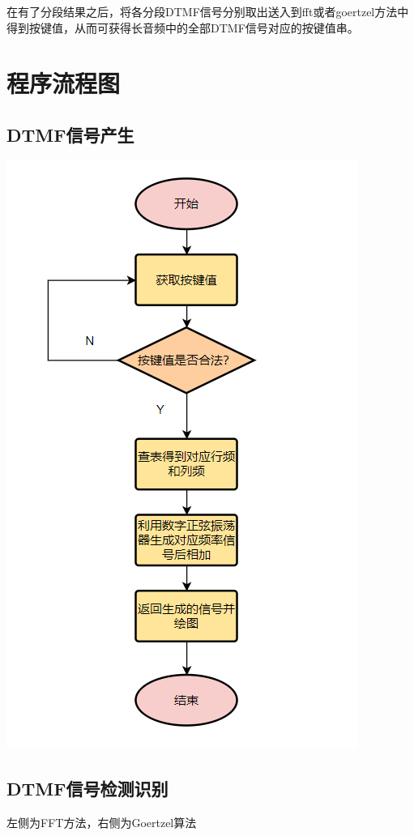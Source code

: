 \documentclass[10pt, a4paper]{article}
\begin{document}
    在有了分段结果之后，将各分段DTMF信号分别取出送入到fft或者goertzel方法中得到按键值，从而可获得长音频中的全部DTMF信号对应的按键值串。

\section{程序流程图}

\subsection{DTMF信号产生}
\centerline{\includegraphics[scale=0.8]{assets/3.png}}

\subsection{DTMF信号检测识别}
左侧为FFT方法，右侧为Goertzel算法
\end{document}
